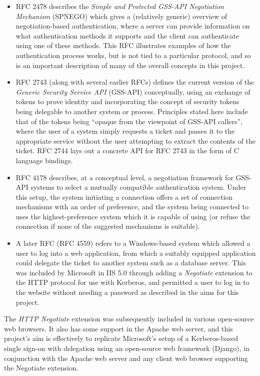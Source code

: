 \documentclass[12pt]{report}
\begin{document}
\begin{itemize}
\item
  RFC 2478\cite{RFC2478} describes the \textit{Simple and Protected GSS-API Negotiation Mechanism} (SPNEGO) which gives a (relatively generic) overview of negotiation-based authentication, where a server can provide information on what authentication methods it supports and the client can authenticate using one of these methods. This RFC illustrates examples of how the authentication process works, but is not tied to a particular protocol, and so is an important description of many of the overall concepts in this project.
\item
  RFC 2743\cite{RFC2743} (along with several earlier RFCs) defines the current version of the \textit{Generic Security Service API} (GSS-API) conceptually, using an exchange of tokens to prove identity and incorporating the concept of security tokens being delegable to another system or process. Principles stated here include that of the tokens being ``opaque from the viewpoint of GSS-API callers'', where the user of a system simply requests a ticket and passes it to the appropriate service without the user attempting to extract the contents of the ticket. RFC 2744\cite{RFC2744} lays out a concrete API for RFC 2743 in the form of C language bindings.
\item
  RFC 4178\cite{RFC4178} describes, at a conceptual level, a negotiation framework for GSS-API systems to select a mutually compatible authentication system. Under this setup, the system initiating a connection offers a set of connection mechanisms with an order of preference, and the system being connected to uses the highest-preference system which it is capable of using (or refuse the connection if none of the suggested mechanisms is suitable).
\item
  A later RFC (RFC 4559\cite{RFC4559}) refers to a Windows-based system which allowed a user to log into a web application, from which a suitably equipped application could delegate the ticket to another system such as a database server. This was included by Microsoft in IIS 5.0 through adding a \textit{Negotiate} extension to the HTTP protocol for use with Kerberos, and permitted a user to log in to the website without needing a password as described in the aims for this project.
\end{itemize}

The \textit{HTTP Negotiate} extension was subsequently included in various open-source web browsers. It also has some support in the Apache web server, and this project's aim is effectively to replicate Microsoft's setup of a Kerberos-based single sign-on with delegation using an open-source web framework (Django), in conjunction with the Apache web server and any client web browser supporting the Negotiate extension.
\end{document}
